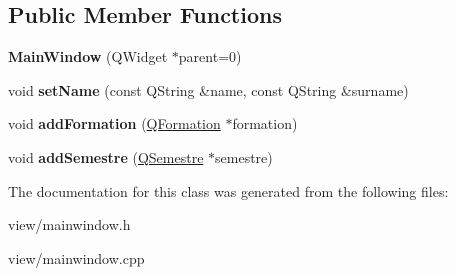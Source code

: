 \subsection*{Public Member Functions}
\begin{DoxyCompactItemize}
\item 
\hypertarget{classMainWindow_a8b244be8b7b7db1b08de2a2acb9409db}{{\bfseries Main\+Window} (Q\+Widget $\ast$parent=0)}\label{classMainWindow_a8b244be8b7b7db1b08de2a2acb9409db}

\item 
\hypertarget{classMainWindow_a2cc7c0de101c3d1e71d0c820caaa090c}{void {\bfseries set\+Name} (const Q\+String \&name, const Q\+String \&surname)}\label{classMainWindow_a2cc7c0de101c3d1e71d0c820caaa090c}

\item 
\hypertarget{classMainWindow_a0a7af10fa2c844b50c01c48e165d8791}{void {\bfseries add\+Formation} (\hyperlink{classQFormation}{Q\+Formation} $\ast$formation)}\label{classMainWindow_a0a7af10fa2c844b50c01c48e165d8791}

\item 
\hypertarget{classMainWindow_a8806edf1fc9c44ae0c05752f75cd03b9}{void {\bfseries add\+Semestre} (\hyperlink{classQSemestre}{Q\+Semestre} $\ast$semestre)}\label{classMainWindow_a8806edf1fc9c44ae0c05752f75cd03b9}

\end{DoxyCompactItemize}


The documentation for this class was generated from the following files\+:\begin{DoxyCompactItemize}
\item 
view/mainwindow.\+h\item 
view/mainwindow.\+cpp\end{DoxyCompactItemize}
